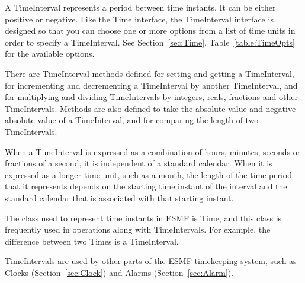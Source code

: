 
A TimeInterval represents a period between time instants.  
It can be either positive or negative.  Like the Time interface, 
the TimeInterval interface is designed so that you can choose 
one or more options from a list of time units in order 
to specify a TimeInterval.  See Section~\ref{sec:Time}, 
Table~\ref{table:TimeOpts} for the available options.

There are TimeInterval methods defined for setting and getting 
a TimeInterval, for incrementing and decrementing a TimeInterval 
by another TimeInterval, and for multiplying and dividing 
TimeIntervals by integers, reals, fractions and other TimeIntervals.  
Methods are also defined to take the absolute value and negative 
absolute value of a TimeInterval, and for comparing the length of two
TimeIntervals.

When a TimeInterval is expressed as a combination of hours, 
minutes, seconds or fractions of a second, it is independent of a 
standard calendar.  When it is expressed as a longer time unit,
such as a month, the length of the time period that it represents 
depends on the starting time instant of the interval and the 
standard calendar that is associated with that starting instant.

The class used to represent time instants in ESMF is Time,
and this class is frequently used in operations along with 
TimeIntervals.  For example, the difference between two
Times is a TimeInterval.  

TimeIntervals are used by other parts of the ESMF timekeeping
system, such as Clocks (Section~\ref{sec:Clock}) and Alarms 
(Section~\ref{sec:Alarm}).





